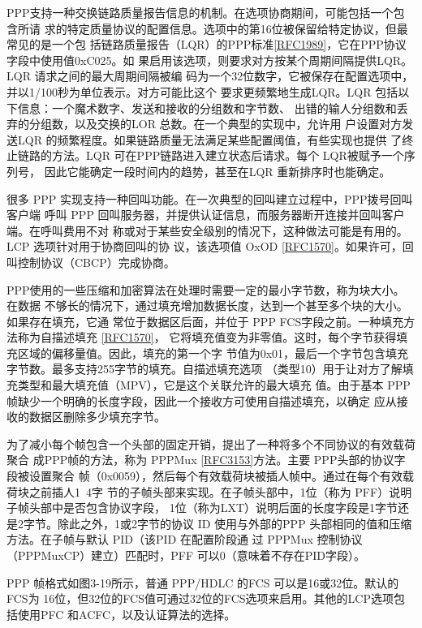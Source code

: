 PPP支持一种交换链路质量报告信息的机制。在选项协商期间，可能包括一个包含所请
求的特定质量协议的配置信息。选项中的第16位被保留给特定协议，但最常见的是一个包
括链路质量报告（LQR）的PPP标准\href{https://www.rfc-editor.org/rfc/rfc1989}{[RFC1989]}，它在PPP协议字段中使用值0xC025。如
果启用该选项，则要求对方按某个周期间隔提供LQR。LQR 请求之间的最大周期间隔被编
码为一个32位数字，它被保存在配置选项中，并以1/100秒为单位表示。对方可能比这个
要求更频繁地生成LQR。LQR 包括以下信息：一个魔术数字、发送和接收的分组数和字节数、
出错的输人分组数和丢弃的分组数，以及交换的LOR 总数。在一个典型的实现中，允许用
户设置对方发送LQR 的频繁程度。如果链路质量无法满足某些配置阈值，有些实现也提供
了终止链路的方法。LQR 可在PPP链路进入建立状态后请求。每个 LQR被赋予一个序列号，
因此它能确定一段时间内的趋势，甚至在LQR 重新排序时也能确定。

很多 PPP 实现支持一种回叫功能。在一次典型的回叫建立过程中，PPP拨号回叫客户端
呼叫 PPP 回叫服务器，并提供认证信息，而服务器断开连接并回叫客户端。在呼叫费用不对
称或对于某些安全级别的情况下，这种做法可能是有用的。LCP 选项针对用于协商回叫的协
议，该选项值 OxOD \href{https://www.rfc-editor.org/rfc/rfc1570}{[RFC1570]}。如果许可，回叫控制协议（CBCP）完成协商。

PPP使用的一些压缩和加密算法在处理时需要一定的最小字节数，称为块大小。在数据
不够长的情况下，通过填充增加数据长度，达到一个甚至多个块的大小。如果存在填充，它通
常位于数据区后面，并位于 PPP FCS字段之前。一种填充方法称为自描述填充 \href{https://www.rfc-editor.org/rfc/rfc1570}{[RFC1570]}，
它将填充值变为非零值。这时，每个字节获得填充区域的偏移量值。因此，填充的第一个字
节值为0x01，最后一个字节包含填充字节数。最多支持255字节的填充。自描述填充选项
（类型10）用于让对方了解填充类型和最大填充值（MPV），它是这个关联允许的最大填充
值。由于基本 PPP 帧缺少一个明确的长度字段，因此一个接收方可使用自描述填充，以确定
应从接收的数据区删除多少填充字节。

为了减小每个帧包含一个头部的固定开销，提出了一种将多个不同协议的有效载荷聚合
成PPP帧的方法，称为 PPPMux \href{https://www.rfc-editor.org/rfc/rfc3153}{[RFC3153]}方法。主要 PPP头部的协议字段被设置聚合
帧（0x0059），然后每个有效载荷块被插人帧中。通过在每个有效载荷块之前插人1~4字
节的子帧头部来实现。在子帧头部中，1位（称为 PFF）说明子帧头部中是否包含协议字段，
1位（称为LXT）说明后面的长度字段是1字节还是2字节。除此之外，1或2字节的协议
ID 使用与外部的PPP 头部相同的值和压缩方法。在子帧与默认 PID（该PID 在配置阶段通
过 PPPMux 控制协议（PPPMuxCP）建立）匹配时，PFF 可以0（意味着不存在PID字段）。

PPP 帧格式如图3-19所示，普通 PPP/HDLC 的FCS 可以是16或32位。默认的FCS为
16位，但32位的FCS值可通过32位的FCS选项来启用。其他的LCP选项包括使用PFC
和ACFC，以及认证算法的选择。

